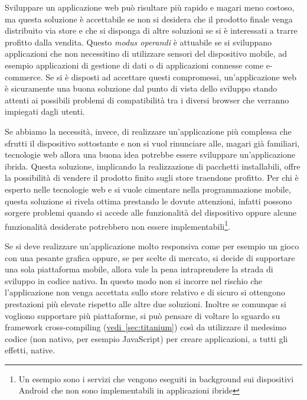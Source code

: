         Sviluppare un applicazione web può risultare più rapido e magari meno
        costoso, ma questa soluzione è accettabile se non si desidera che il
        prodotto finale venga distribuito via store e che si disponga di
        altre soluzioni se si è interessati a trarre profitto dalla vendita.
        Questo \textit{modus operandi} è attuabile se si sviluppano applicazioni
        che non necessitino di utilizzare sensori del dispositivo mobile, ad
        esempio applicazioni di gestione di dati o di applicazioni connesse
        come e-commerce. Se si è disposti ad accettare questi compromessi,
        un'applicazione web è sicuramente una buona soluzione dal punto di vista
        dello sviluppo \crossplat{} stando attenti ai possibili problemi di
        compatibilità tra i diversi browser che verranno impiegati dagli utenti.

        Se abbiamo la necessità, invece, di realizzare un'applicazione più
        complessa che sfrutti il dispositivo sottostante e non si vuol
        rinunciare alle, magari già familiari, tecnologie web allora una buona
        idea potrebbe essere sviluppare un'applicazione ibrida. Questa
        soluzione, implicando la realizzazione di pacchetti installabili, offre
        la possibilità di vendere il prodotto finito sugli store traendone
        profitto. Per chi è esperto nelle tecnologie web e si vuole cimentare
        nella programmazione mobile, questa soluzione si rivela ottima prestando
        le dovute attenzioni, infatti possono sorgere problemi quando si accede
        alle funzionalità del dispositivo oppure alcune funzionalità desiderate
        potrebbero non essere implementabili\footnote{Un esempio sono i servizi
        che vengono eseguiti in background sui dispositivi Android che non sono
        implementabili in applicazioni ibride}.

        Se si deve realizzare un'applicazione molto responsiva come per esempio
        un gioco con una pesante grafica oppure, se per scelte di mercato, si
        decide di supportare una sola piattaforma mobile, allora vale la pena
        intraprendere la strada di sviluppo in codice nativo. In questo modo non
        si incorre nel rischio che l'applicazione non venga accettata sullo
        store relativo e di sicuro si ottengono prestazioni più elevate rispetto
        alle altre due soluzioni. Inoltre se comunque si vogliono supportare più
        piattaforme, si può pensare di voltare lo sguardo su framework
        cross-compiling (\hyperref[sec:titanium]{vedi~\ref{sec:titanium}}) così
        da utilizzare il medesimo codice (non nativo, per esempio JavaScript)
        per creare applicazioni, a tutti gli effetti, native.


